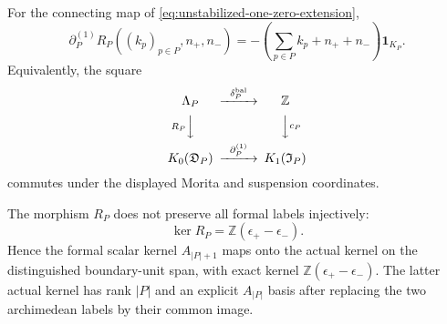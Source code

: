 \begin{theorem}
\label{thm:unstabilized-codiagonal-shadow}
For the connecting map of
\eqref{eq:unstabilized-one-zero-extension},
\begin{equation}
 \partial_P^{(1)}R_P
 ( (k_p)_{p\in P},n_+,n_- )
 =-\left(\sum_{p\in P}k_p+n_++n_-\right)\mathbf1_{K_P}.
 \label{eq:unstabilized-codiagonal-formula}
\end{equation}
Equivalently, the square
\begin{equation}
\begin{CD}
 \Lambda_P @>{\delta_P^{\mathrm{bal}}}>> \mathbb Z\\
 @V{R_P}VV @VV{c_P}V\\
 K_0(\mathfrak D_P) @>{\partial_P^{(1)}}>> K_1(\mathfrak I_P)
\end{CD}
\label{eq:stable-to-unstabilized-k-square}
\end{equation}
commutes under the displayed Morita and suspension coordinates.

The morphism $R_P$ does not preserve all formal labels injectively:
\begin{equation}
 \ker R_P=\mathbb Z(\epsilon_+-\epsilon_-).
 \label{eq:unstabilized-boundary-label-kernel}
\end{equation}
Hence the formal scalar kernel $A_{|P|+1}$ maps onto the actual kernel on the
distinguished boundary-unit span, with exact kernel
$\mathbb Z(\epsilon_+-\epsilon_-)$.  The latter actual kernel has rank $|P|$
and an explicit $A_{|P|}$ basis after replacing the two archimedean labels by
their common image.
\end{theorem}

